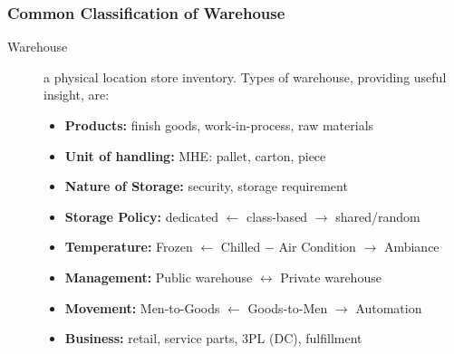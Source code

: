 \documentclass[10pt,handout,notes=show]{beamer}
\begin{document}
\begin{frame}
  \frametitle{Common Classification of Warehouse}

  \begin{description}
    \item[Warehouse] a physical location store inventory. Types of warehouse, providing useful \alert{insight}, are:
      \small{
      \begin{itemize}
        \item \textbf{Products:} finish goods, work-in-process, raw materials
        \item \textbf{Unit of handling:}  MHE: pallet, carton, piece
        \item \textbf{Nature of Storage:} security, storage requirement
        \item \textbf{Storage Policy:} dedicated $\leftarrow$ class-based $\rightarrow$ shared/random
        \item \textbf{Temperature:} Frozen $\leftarrow$ Chilled $-$ Air Condition $\rightarrow$ Ambiance
        \item \textbf{Management:} Public warehouse $\leftrightarrow$ Private warehouse
        \item \textbf{Movement:} Men-to-Goods $\leftarrow$ Goods-to-Men $\rightarrow$ Automation
        \item \textbf{Business:} retail, service parts, 3PL (DC), fulfillment
      \end{itemize} }
  \end{description}



\end{frame}
\end{document}
